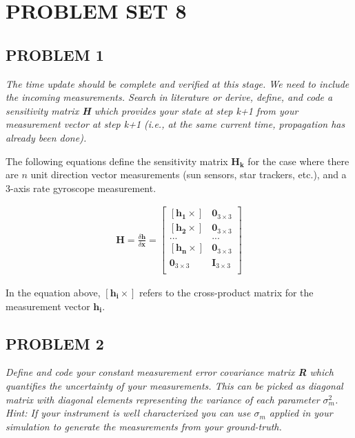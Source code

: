 \section{\Large PROBLEM SET 8}
\subsection{PROBLEM 1}
\textit{The time update should be complete and verified at this stage. We need to include the incoming measurements. Search in literature or derive, define, and code a sensitivity matrix \textbf{H} which provides your state at step k+1 from your measurement vector at step k+1 (i.e., at the same current time, propagation has already been done).}

The following equations define the sensitivity matrix $\mathbf{H_k}$ for the case where there are $n$ unit direction vector measurements (sun sensors, star trackers, etc.), and a 3-axis rate gyroscope measurement.

\begin{align*}
    \mathbf{H} = \frac{\delta \mathbf{h}}{\delta \mathbf{x}} =
    \begin{bmatrix}
        [\mathbf{h_1} \times] & \mathbf{0}_{3 \times 3} \\
        [\mathbf{h_2} \times] & \mathbf{0}_{3 \times 3} \\
        ... & ... \\
        [\mathbf{h_n} \times] & \mathbf{0}_{3 \times 3} \\
        \mathbf{0}_{3 \times 3} & \mathbf{I}_{3 \times 3} \\
    \end{bmatrix}
\end{align*}

In the equation above, $[\mathbf{h_i} \times]$ refers to the cross-product matrix for the measurement vector $\mathbf{h_i}$.

\subsection{PROBLEM 2}
\textit{Define and code your constant measurement error covariance matrix \textbf{R} which quantifies the uncertainty of your measurements. This can be picked as diagonal matrix with diagonal elements representing the variance of each parameter $\sigma^{2}_{m}$. Hint: If your instrument is well characterized you can use $\sigma_{m}$ applied in your simulation to generate the measurements from your ground-truth.}

